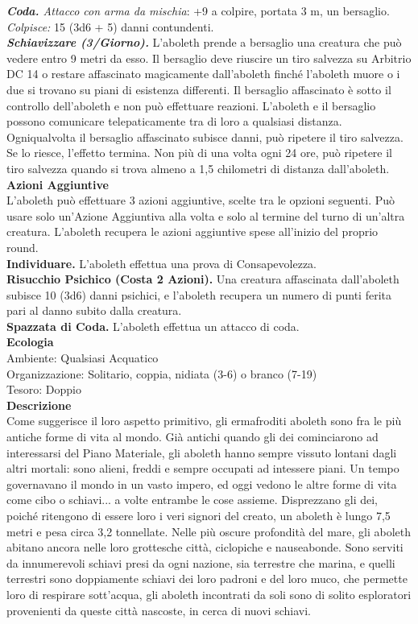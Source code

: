 \begin{multicols}{2}
\emph{\textbf{Coda.} Attacco con arma da mischia}: +9 a colpire, portata 3 m, un bersaglio.\\
\emph{Colpisce:} 15 (3d6 + 5) danni contundenti.\\
\emph{\textbf{Schiavizzare (3/Giorno).}} L'aboleth prende a bersaglio
una creatura che può vedere entro 9 metri da esso. Il bersaglio deve
riuscire un tiro salvezza su Arbitrio DC 14 o restare affascinato
magicamente dall'aboleth finché l'aboleth muore o i due si trovano su
piani di esistenza differenti. Il bersaglio affascinato è sotto il
controllo dell'aboleth e non può effettuare reazioni. L'aboleth e il
bersaglio possono comunicare telepaticamente tra di loro a qualsiasi
distanza.\\
Ogniqualvolta il bersaglio affascinato subisce danni, può ripetere il
tiro salvezza. Se lo riesce, l'effetto termina. Non più di una volta
ogni 24 ore, può ripetere il tiro salvezza quando si trova almeno a 1,5
chilometri di distanza dall'aboleth.\\
\textbf{Azioni Aggiuntive}\\
L'aboleth può effettuare 3 azioni aggiuntive, scelte tra le opzioni seguenti. Può usare solo un'Azione Aggiuntiva alla volta e solo al termine del turno di un'altra creatura. L'aboleth recupera le azioni aggiuntive spese all'inizio del proprio round.\\
\textbf{Individuare.} L'aboleth effettua una prova di Consapevolezza. \\
\textbf{Risucchio Psichico (Costa 2 Azioni).} Una creatura affascinata dall'aboleth subisce 10 (3d6) danni psichici, e l'aboleth recupera un numero di punti ferita pari al danno subito dalla creatura.\\
\textbf{Spazzata di Coda.} L'aboleth effettua un attacco di coda.\\
\textbf{Ecologia}\\
Ambiente: Qualsiasi Acquatico\\
Organizzazione: Solitario, coppia, nidiata (3-6) o branco (7-19)\\
Tesoro: Doppio\\
\textbf{Descrizione}\\
Come suggerisce il loro aspetto primitivo, gli ermafroditi aboleth sono fra le più antiche forme di vita al mondo. Già antichi quando gli dei cominciarono ad interessarsi del Piano Materiale, gli aboleth hanno sempre vissuto lontani dagli altri mortali: sono alieni, freddi e sempre occupati ad intessere piani. Un tempo governavano il mondo in un vasto impero, ed oggi vedono le altre forme di vita come cibo o schiavi... a volte entrambe le cose assieme. Disprezzano gli dei, poiché ritengono di essere loro i veri signori del creato, un aboleth è lungo 7,5 metri e pesa circa 3,2 tonnellate. Nelle più oscure profondità del mare, gli aboleth abitano ancora nelle loro grottesche città, ciclopiche e nauseabonde. Sono serviti da innumerevoli schiavi presi da ogni nazione, sia terrestre che marina, e quelli terrestri sono doppiamente schiavi dei loro padroni e del loro muco, che permette loro di respirare sott'acqua, gli aboleth incontrati da soli sono di solito esploratori provenienti da queste città nascoste, in cerca di nuovi schiavi.\\



\end{multicols}
